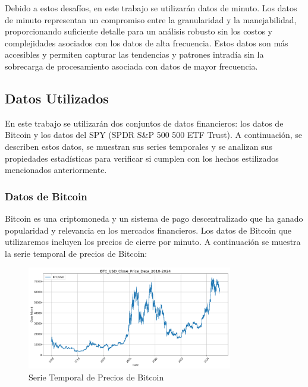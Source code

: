 \documentclass[a4paper,12pt]{report}
\begin{document}
Debido a estos desafíos, en este trabajo se utilizarán datos de minuto. Los datos de minuto representan un compromiso entre la 
granularidad y la manejabilidad, proporcionando suficiente detalle para un análisis robusto sin los costos y complejidades asociados 
con los datos de alta frecuencia. Estos datos son más accesibles y permiten capturar las tendencias y patrones intradía sin la 
sobrecarga de procesamiento asociada con datos de mayor frecuencia.


\subsection{Datos Utilizados}

En este trabajo se utilizarán dos conjuntos de datos financieros: los datos de Bitcoin y los datos del SPY (SPDR S\&P 500 500 ETF Trust). 
A continuación, se describen estos datos, se muestran sus series temporales y se analizan sus propiedades estadísticas para verificar 
si cumplen con los hechos estilizados mencionados anteriormente.

\subsubsection{Datos de Bitcoin}

Bitcoin es una criptomoneda y un sistema de pago descentralizado que ha ganado popularidad y relevancia en los mercados financieros. 
Los datos de Bitcoin que utilizaremos incluyen los precios de cierre por minuto. A continuación se muestra la serie temporal de precios 
de Bitcoin:

\begin{figure}[H]
    \centering
    \includegraphics[width=0.8\textwidth]{./figures/BTC_USD_Close_Price_Data_2018-2024.png}
    \caption{Serie Temporal de Precios de Bitcoin}
    \label{fig:bitcoin-prices}
\end{figure}
\end{document}
